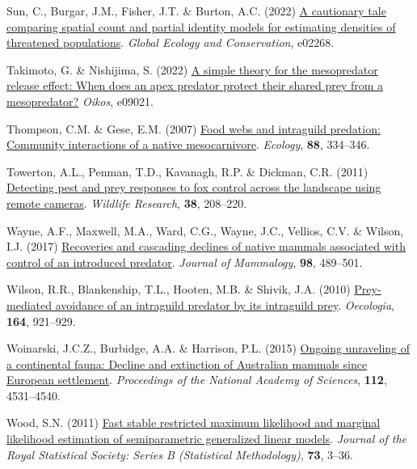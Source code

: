 \documentclass[preprint, 3p, authoryear]{elsarticle} %
\newlength{\cslhangindent}
\newlength{\cslentryspacingunit} %
\newenvironment{CSLReferences}[2] %
 {%
  \setlength{\parindent}{0pt}
  \ifodd #1
  \let\oldpar\par
  \def\par{\hangindent=\cslhangindent\oldpar}
  \fi
  \setlength{\parskip}{#2\cslentryspacingunit}
 }%
 {}
\begin{document}
\begin{CSLReferences}{1}{0}
\leavevmode{}%
Sun, C., Burgar, J.M., Fisher, J.T. \& Burton, A.C. (2022) \href{https://doi.org/10.1016/j.gecco.2022.e02268}{A cautionary tale comparing spatial count and partial identity models for estimating densities of threatened populations}. \emph{Global Ecology and Conservation}, e02268.

\leavevmode{}%
Takimoto, G. \& Nishijima, S. (2022) \href{\%20https://doi.org/10.1111/oik.09021}{A simple theory for the mesopredator release effect: When does an apex predator protect their shared prey from a mesopredator?} \emph{Oikos}, e09021.

\leavevmode{}%
Thompson, C.M. \& Gese, E.M. (2007) \href{https://doi.org/10.1890/0012-9658(2007)88\%5B334:FWAIPC\%5D2.0.CO;2}{Food webs and intraguild predation: Community interactions of a native mesocarnivore}. \emph{Ecology}, \textbf{88}, 334--346.

\leavevmode{}%
Towerton, A.L., Penman, T.D., Kavanagh, R.P. \& Dickman, C.R. (2011) \href{https://doi.org/10.1071/WR10213}{Detecting pest and prey responses to fox control across the landscape using remote cameras}. \emph{Wildlife Research}, \textbf{38}, 208--220.

\leavevmode{}%
Wayne, A.F., Maxwell, M.A., Ward, C.G., Wayne, J.C., Vellios, C.V. \& Wilson, I.J. (2017) \href{https://doi.org/10.1093/jmammal/gyw237}{{Recoveries and cascading declines of native mammals associated with control of an introduced predator}}. \emph{Journal of Mammalogy}, \textbf{98}, 489--501.

\leavevmode{}%
Wilson, R.R., Blankenship, T.L., Hooten, M.B. \& Shivik, J.A. (2010) \href{https://doi.org/10.1007/s00442-010-1797-8}{Prey-mediated avoidance of an intraguild predator by its intraguild prey}. \emph{Oecologia}, \textbf{164}, 921--929.

\leavevmode{}%
Woinarski, J.C.Z., Burbidge, A.A. \& Harrison, P.L. (2015) \href{https://doi.org/10.1073/pnas.1417301112}{Ongoing unraveling of a continental fauna: Decline and extinction of {{A}ustralian} mammals since {European} settlement}. \emph{Proceedings of the National Academy of Sciences}, \textbf{112}, 4531--4540.

\leavevmode{}%
Wood, S.N. (2011) \href{\%20https://doi.org/10.1111/j.1467-9868.2010.00749.x}{Fast stable restricted maximum likelihood and marginal likelihood estimation of semiparametric generalized linear models}. \emph{Journal of the Royal Statistical Society: Series B (Statistical Methodology)}, \textbf{73}, 3--36.


\end{CSLReferences}
\end{document}
